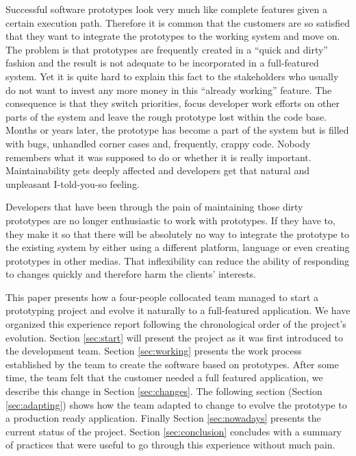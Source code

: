 \documentclass[lnbip]{svmultln}
\begin{document}
Successful software prototypes look very much like complete features
given a certain execution path. Therefore it is common that the
customers are so satisfied that they want to integrate the prototypes
to the working system and move on. The problem is that prototypes are
frequently created in a ``quick and dirty'' fashion and the result is
not adequate to be incorporated in a full-featured system. Yet it is
quite hard to explain this fact to the stakeholders who usually do not
want to invest any more money in this ``already working'' feature. The
consequence is that they switch priorities, focus developer work
efforts on other parts of the system and leave the rough prototype
lost within the code base. Months or years later, the prototype has
become a part of the system but is filled with bugs, unhandled corner
cases and, frequently, crappy code. Nobody remembers what it was
supposed to do or whether it is really important. Maintainability gets
deeply affected and developers get that natural and unpleasant
I-told-you-so feeling. %

Developers that have been through the pain of maintaining those dirty
prototypes are no longer enthusiastic to work with prototypes. If they
have to, they make it so that there will be absolutely no way to
integrate the prototype to the existing system by either using a
different platform, language or even creating prototypes in other
medias. That inflexibility can reduce the ability of responding to
changes quickly and therefore harm the clients' interests.

This paper presents how a four-people collocated team managed to start
a prototyping project and evolve it naturally to a full-featured
application.  We have organized this experience report following the
chronological order of the project's evolution. Section
\ref{sec:start} will present the project as it was first introduced to
the development team. Section \ref{sec:working} presents the work
process established by the team to create the software based on
prototypes. After some time, the team felt that the customer needed a
full featured application, we describe this change in Section
\ref{sec:changes}. The following section (Section \ref{sec:adapting})
shows how the team adapted to change to evolve the prototype to a
production ready application. Finally Section \ref{sec:nowadays}
presents the current status of the project. Section \ref{sec:conclusion} concludes with a
summary of practices that were useful to go through this experience
without much pain.
\end{document}

